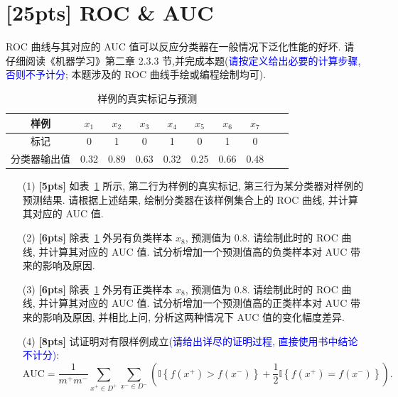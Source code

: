 \documentclass[a4paper,UTF8]{article}
\numberwithin{equation}{section}
\theoremstyle{definition}
\begin{document}
\section{[25pts] ROC \& AUC}
ROC 曲线与其对应的 AUC 值可以反应分类器在一般情况下泛化性能的好坏. 请仔细阅读《机器学习》第二章 2.3.3 节,并完成本题(\textcolor{blue}{请按定义给出必要的计算步骤, 否则不予计分}; 本题涉及的 ROC 曲线手绘或编程绘制均可).
\begin{table}[ht]
    \centering
    \caption{样例的真实标记与预测}
    \begin{tabular}{c|ccccccccc}
        \hline 样例 & $x_1$ & $x_2$ & $x_3$ & $x_4$ & $x_5$ & $x_6$ & $x_7$ \\
        \hline 标记 & 0 & 1 & 0 & 1 & 0 & 1 & 0 \\
        \hline 分类器输出值 & 0.32 & 0.89 & 0.63 & 0.32 & 0.25 & 0.66 & 0.48 \\
        \hline
    \end{tabular}
    \label{tab:samples}
\end{table} 
\begin{enumerate}
    \item[(1)] \textbf{[5pts]}  如表~\ref{tab:samples} 所示, 第二行为样例的真实标记, 第三行为某分类器对样例的预测结果. 请根据上述结果, 绘制分类器在该样例集合上的 ROC 曲线, 并计算其对应的 AUC 值.
    \item[(2)] \textbf{[6pts]}  除表~\ref{tab:samples} 外另有负类样本 $x_8$, 预测值为 0.8. 请绘制此时的 ROC 曲线, 并计算其对应的 AUC 值. 试分析增加一个预测值高的负类样本对 AUC 带来的影响及原因. 
    \item[(3)] \textbf{[6pts]}  除表~\ref{tab:samples} 外另有正类样本 $x_8$, 预测值为 0.8. 请绘制此时的 ROC 曲线, 并计算其对应的 AUC 值. 试分析增加一个预测值高的正类样本对 AUC 带来的影响及原因, 并相比上问, 分析这两种情况下 AUC 值的变化幅度差异. 
    \item[(4)] \textbf{[8pts]}  试证明对有限样例成立\textcolor{blue}{(请给出详尽的证明过程, 直接使用书中结论不计分)}:
    \begin{equation}
        \label{eq:auc}
            \text{AUC} = \frac{1}{m^+m^-}\sum_{x^+\in D^+}\sum_{x^-\in D^-}\left(\mathbb{I}\left\{f(x^+) > f(x^-)\right\}+\frac{1}{2}\mathbb{I}\left\{f(x^+)=f(x^-)\right\}\right).
    \end{equation}    
\end{enumerate}
\end{document}
